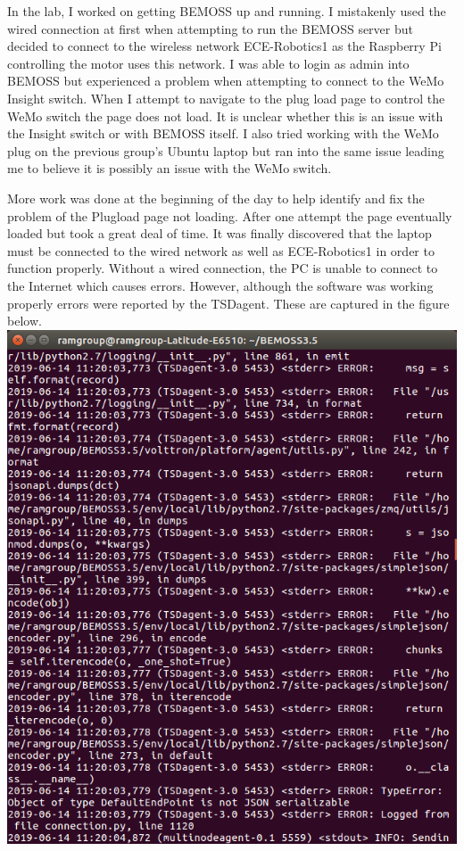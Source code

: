 \documentclass[fontsize=11pt, %
                             paper=letter, %
                             twoside, %
                             captions=tableheading,
                             index=totoc,
                             hyperref]{labbook}
\begin{document}
\begin{addmargin}[0cm]{0cm}
In the lab, I worked on getting BEMOSS up and running. I mistakenly used the wired connection at first when attempting to run the BEMOSS server but decided to connect to the wireless network ECE-Robotics1 as the Raspberry Pi controlling the motor uses this network. I was able to login as admin into BEMOSS but experienced a problem when attempting to connect to the WeMo Insight switch. When I attempt to navigate to the plug load page to control the WeMo switch the page does not load. It is unclear whether this is an issue with the Insight switch or with BEMOSS itself. I also tried working with the WeMo plug on the previous group's Ubuntu laptop but ran into the same issue leading me to believe it is possibly an issue with the WeMo switch.

More work was done at the beginning of the day to help identify and fix the problem of the Plugload page not loading. After one attempt the page eventually loaded but took a great deal of time. It was finally discovered that the laptop must be connected to the wired network as well as ECE-Robotics1 in order to function properly. Without a wired connection, the PC is unable to connect to the Internet which causes errors. However, although the software was working properly errors were reported by the TSDagent. These are captured in the figure below.
\bigbreak\noindent
\includegraphics[scale=0.5]{figs/screenshot61419.png}


\end{addmargin}
\end{document}

